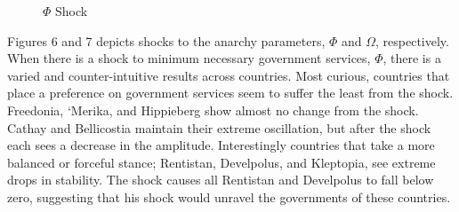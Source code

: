 \documentclass[12pt]{article}
\begin{document}
\begin{spacing}{1.5}
\begin{figure}[htb]
\centering 
{} 
\caption{$\Phi$ Shock}
\end{figure}

Figures 6 and 7 depicts shocks to the anarchy parameters, $\Phi$ and $\Omega$, respectively. When there is a shock to minimum necessary government services, $\Phi$, there is a varied and counter-intuitive results across countries. Most curious, countries that place a preference on government services seem to suffer the least from the shock. Freedonia, `Merika, and Hippieberg show almost no change from the shock. Cathay and Bellicostia maintain their extreme oscillation, but after the shock each sees a decrease in the amplitude. Interestingly countries that take a more balanced or forceful stance; Rentistan, Develpolus, and Kleptopia, see extreme drops in stability. The shock causes all Rentistan and Develpolus to fall below zero, suggesting that his shock would unravel the governments of these countries.   


\end{spacing}
\end{document}
